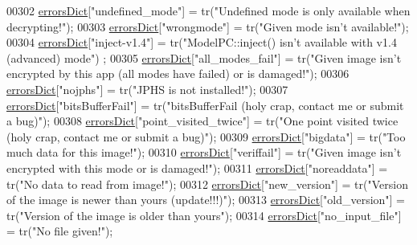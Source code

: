 \begin{DoxyCode}
00302     \hyperlink{class_view_p_c_aaf7f058e5589d65fec72a21abfd5629b}{errorsDict}[\textcolor{stringliteral}{"undefined\_mode"}] = tr(\textcolor{stringliteral}{"Undefined mode is only available when decrypting!"});
00303     \hyperlink{class_view_p_c_aaf7f058e5589d65fec72a21abfd5629b}{errorsDict}[\textcolor{stringliteral}{"wrongmode"}] = tr(\textcolor{stringliteral}{"Given mode isn't available!"});
00304     \hyperlink{class_view_p_c_aaf7f058e5589d65fec72a21abfd5629b}{errorsDict}[\textcolor{stringliteral}{"inject-v1.4"}] = tr(\textcolor{stringliteral}{"ModelPC::inject() isn't available with v1.4 (advanced) mode"})
      ;
00305     \hyperlink{class_view_p_c_aaf7f058e5589d65fec72a21abfd5629b}{errorsDict}[\textcolor{stringliteral}{"all\_modes\_fail"}] = tr(\textcolor{stringliteral}{"Given image isn't encrypted by this app (all modes have
       failed) or is damaged!"});
00306     \hyperlink{class_view_p_c_aaf7f058e5589d65fec72a21abfd5629b}{errorsDict}[\textcolor{stringliteral}{"nojphs"}] = tr(\textcolor{stringliteral}{"JPHS is not installed!"});
00307     \hyperlink{class_view_p_c_aaf7f058e5589d65fec72a21abfd5629b}{errorsDict}[\textcolor{stringliteral}{"bitsBufferFail"}] = tr(\textcolor{stringliteral}{"bitsBufferFail (holy crap, contact me or submit a bug)"});
00308     \hyperlink{class_view_p_c_aaf7f058e5589d65fec72a21abfd5629b}{errorsDict}[\textcolor{stringliteral}{"point\_visited\_twice"}] = tr(\textcolor{stringliteral}{"One point visited twice (holy crap, contact me or
       submit a bug)"});
00309     \hyperlink{class_view_p_c_aaf7f058e5589d65fec72a21abfd5629b}{errorsDict}[\textcolor{stringliteral}{"bigdata"}] = tr(\textcolor{stringliteral}{"Too much data for this image!"});
00310     \hyperlink{class_view_p_c_aaf7f058e5589d65fec72a21abfd5629b}{errorsDict}[\textcolor{stringliteral}{"veriffail"}] = tr(\textcolor{stringliteral}{"Given image isn't encrypted with this mode or is damaged!"});
00311     \hyperlink{class_view_p_c_aaf7f058e5589d65fec72a21abfd5629b}{errorsDict}[\textcolor{stringliteral}{"noreaddata"}] = tr(\textcolor{stringliteral}{"No data to read from image!"});
00312     \hyperlink{class_view_p_c_aaf7f058e5589d65fec72a21abfd5629b}{errorsDict}[\textcolor{stringliteral}{"new\_version"}] = tr(\textcolor{stringliteral}{"Version of the image is newer than yours (update!!!)"});
00313     \hyperlink{class_view_p_c_aaf7f058e5589d65fec72a21abfd5629b}{errorsDict}[\textcolor{stringliteral}{"old\_version"}] = tr(\textcolor{stringliteral}{"Version of the image is older than yours"});
00314     \hyperlink{class_view_p_c_aaf7f058e5589d65fec72a21abfd5629b}{errorsDict}[\textcolor{stringliteral}{"no\_input\_file"}] = tr(\textcolor{stringliteral}{"No file given!"});

\end{DoxyCode}
